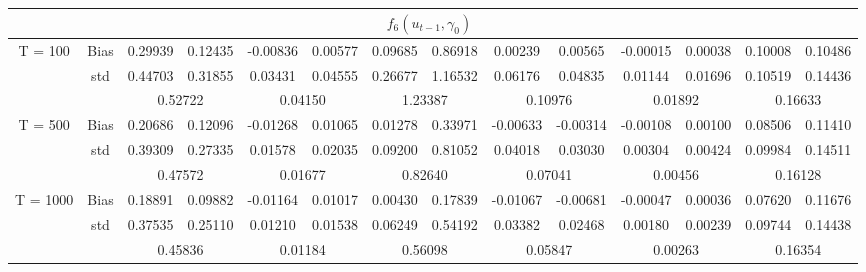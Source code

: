 \documentclass[a4paper,12pt,times,numbered,print,index]{report}
\numberwithin{equation}{section}
\begin{document}
\begin{table}[htbp]
\begin{adjustbox}{max width=\textwidth}
\begin{tabular}{cccccccccccccc}
				\midrule
				&       & \multicolumn{10}{c}{$f_6 (u_{t-1}, \gamma_0)$}                \\
				\midrule
				\multirow{3}[1]{*}{T = 100} & Bias  & 0.29939 & 0.12435 & -0.00836 & 0.00577 & 0.09685 & 0.86918 & 0.00239 & 0.00565 & -0.00015 & 0.00038 & 0.10008 & 0.10486 \\
				& std   & 0.44703 & 0.31855 & 0.03431 & 0.04555 & 0.26677 & 1.16532 & 0.06176 & 0.04835 & 0.01144 & 0.01696 & 0.10519 & 0.14436 \\
				&       & \multicolumn{2}{c}{0.52722} & \multicolumn{2}{c}{0.04150} & \multicolumn{2}{c}{1.23387} & \multicolumn{2}{c}{0.10976} & \multicolumn{2}{c}{0.01892} & \multicolumn{2}{c}{0.16633} \\
				\multirow{3}[0]{*}{T = 500} & Bias  & 0.20686 & 0.12096 & -0.01268 & 0.01065 & 0.01278 & 0.33971 & -0.00633 & -0.00314 & -0.00108 & 0.00100 & 0.08506 & 0.11410 \\
				& std   & 0.39309 & 0.27335 & 0.01578 & 0.02035 & 0.09200 & 0.81052 & 0.04018 & 0.03030 & 0.00304 & 0.00424 & 0.09984 & 0.14511 \\
				&       & \multicolumn{2}{c}{0.47572} & \multicolumn{2}{c}{0.01677} & \multicolumn{2}{c}{0.82640} & \multicolumn{2}{c}{0.07041} & \multicolumn{2}{c}{0.00456} & \multicolumn{2}{c}{0.16128} \\
				\multirow{3}[1]{*}{T = 1000} & Bias  & 0.18891 & 0.09882 & -0.01164 & 0.01017 & 0.00430 & 0.17839 & -0.01067 & -0.00681 & -0.00047 & 0.00036 & 0.07620 & 0.11676 \\
				& std   & 0.37535 & 0.25110 & 0.01210 & 0.01538 & 0.06249 & 0.54192 & 0.03382 & 0.02468 & 0.00180 & 0.00239 & 0.09744 & 0.14438 \\
				&       & \multicolumn{2}{c}{0.45836} & \multicolumn{2}{c}{0.01184} & \multicolumn{2}{c}{0.56098} & \multicolumn{2}{c}{0.05847} & \multicolumn{2}{c}{0.00263} & \multicolumn{2}{c}{0.16354} \\
				\bottomrule
				\bottomrule
			\end{tabular}%
		\end{adjustbox}
		\label{s_f56}%
	\end{table}%
	
\end{document}
